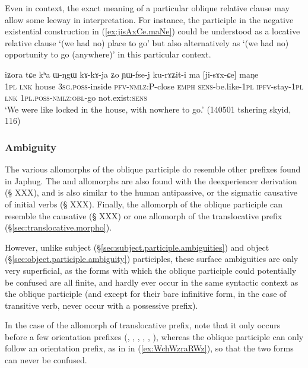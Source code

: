 Even in context, the exact meaning of a particular oblique relative clause may allow some leeway in interpretation. For instance, the participle  in the negative existential construction in (\ref{ex:jisAxCe.maNe}) could be understood as a locative relative clause `(we had no) place to go' but also alternatively as `(we had no) opportunity to go (anywhere)' in this particular context.

\begin{exe}
\ex \label{ex:jisAxCe.maNe}
\gll  iʑora tɕe kʰa ɯ-ŋgɯ kɤ-kɤ-ja ʑo ɲɯ-fse-j ku-rɤʑit-i ma [ji-sɤx-ɕe] maŋe \\
\textsc{1pl} \textsc{lnk} house \textsc{3sg}.\textsc{poss}-inside \textsc{pfv}-\textsc{nmlz}:P-close \textsc{emph} \textsc{sens}-be.like-\textsc{1pl} \textsc{ipfv}-stay-\textsc{1pl} \textsc{lnk} \textsc{1pl}.\textsc{poss}-\textsc{nmlz}:\textsc{obl}-go not.exist:\textsc{sens} \\
\glt  `We were like locked in the house, with nowhere to go.' (140501 tshering skyid, 116)
\end{exe}

\subsubsection{Ambiguity} \label{sec:oblique.participle.ambiguity}
The various allomorphs of the oblique participle do resemble other prefixes found in Japhug. The  and  allomorphs are also found with the deexperiencer derivation (§ XXX), and  is also similar to the human antipassive, or the sigmatic causative of  initial verbs (§ XXX). Finally, the  allomorph of the oblique participle can resemble the causative (§ XXX) or one allomorph of the translocative prefix (§\ref{sec:translocative.morpho}).

However, unlike subject (§\ref{sec:subject.participle.ambiguities}) and object (§\ref{sec:object.participle.ambiguity}) participles, these surface ambiguities are only very superficial, as the forms with which the oblique participle could potentially be confused are all finite, and hardly ever occur in the same syntactic context as the oblique participle (and except for their bare infinitive form, in the case of transitive verb, never occur with a possessive prefix). 

In the case of the  allomorph of translocative prefix, note that it only occurs before a few orientation prefixes (, , , , , ), whereas the oblique participle  can only follow an orientation prefix, as in  in (\ref{ex:WchWzraRWz}), so that the two forms can never be confused.


